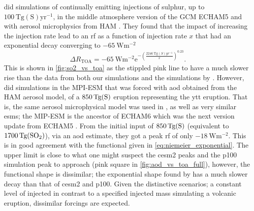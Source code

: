 \documentclass{ametsocV5}
\newcommand{\iso}[1][i]{{#1}njected \ce{SO2}}
\begin{document}
\citet{niemeier2015} did simulations of continually emitting injections of sulphur, up
to \(\SI{100}{\tera\gram \mathrm{(S)}\mathrm{yr}^{-1}}\), in the middle atmosphere
version of the GCM ECHAM5 \citep{giorgetta2006} and with aerosol microphysics from HAM
\citep{stier2005}. They found that the impact of increasing the injection rate lead to
an \ac{rf} as a function of injection rate \(x\) that had an exponential decay
converging to \(\SI{-65}{\watt\meter^{-2}}\)
\begin{equation}
  \Delta
  R_{\mathrm{TOA}} =
  -\SI{65}{\watt\metre^{-2}}
  \mathrm{e}^{-{\left(\frac{\SI{2246}{\tera\gram(S)yr^{-1}}}{x}\right)}^{0.23}}.
  \label{eq:niemeier_exponential}
\end{equation}
%
This is shown in \cref{fig:so2_vs_toa} as the stippled pink line to have a much slower
rise than the data from both our simulations and the simulations by
\citet{ottobliesner2016}. However, \citet{timmreck2010} did simulations in the MPI-ESM
that was forced with \ac{aod} obtained from the HAM aerosol model, of a
\(\SI{850}{\tera\gram(\ce{S})}\) eruption representing the \ac{ytt} eruption. That is,
the same aerosol microphysical model was used in \citet{timmreck2010, niemeier2015}, as
well as very similar \acp{esm}; the MIP-ESM is the ancestor of ECHAM6 which was the next
version update from ECHAM5 \citep{kuma23}. From the initial input of
\(\SI{850}{\tera\gram(\ce{S})}\) (equivalent to \(\SI{1700}{\tera\gram(\ce{SO2})}\)),
via an \ac{aod} estimate, they got a peak \ac{rf} of only
\(\SI{-18}{\watt\metre^{-2}}\). This is in good agreement with the functional given in
\cref{eq:niemeier_exponential}. The upper limit is close to what one might suspect the
\ac{cesm2} peaks and the \ac{p100} simulation peak to approach (pink square in
\cref{fig:aod_vs_toa_full}), however, the functional shape is dissimilar; the
exponential shape found by \citet{niemeier2015} has a much slower decay than that of
\ac{cesm2} and \ac{p100}. Given the distinctive scenarios; a constant level of \iso{} in
contrast to a specified injected mass simulating a volcanic eruption, dissimilar
forcings are expected.

\end{document}
